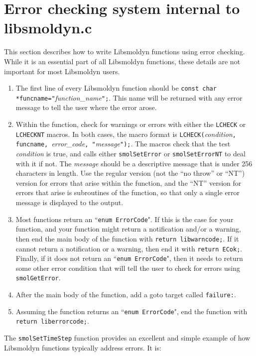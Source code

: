 \documentclass {book}
\newcommand {\ttt} {\texttt}
\begin{document}
\section{Error checking system internal to libsmoldyn.c}

This section describes how to write Libsmoldyn functions using error checking. While it is an essential part of all Libsmoldyn functions, these details are not important for most Libsmoldyn users.

\begin{enumerate}
\item The first line of every Libsmoldyn function should be \ttt{const char *funcname="}\emph{function\_name}\ttt{";}. This name will be returned with any error message to tell the user where the error arose.
\item Within the function, check for warnings or errors with either the \ttt{LCHECK} or \ttt{LCHECKNT} macros. In both cases, the macro format is \ttt{LCHECK(}\emph{condition}\ttt{, funcname, }\emph{error\_code}\ttt{, "}\emph{message}\ttt{");}. The macros check that the test \emph{condition} is true, and calls either \ttt{smolSetError} or \ttt{smolSetErrorNT} to deal with it if not. The \emph{message} should be a descriptive message that is under 256 characters in length. Use the regular version (not the ``no throw'' or ``NT'') version for errors that arise within the function, and the ``NT'' version for errors that arise is subroutines of the function, so that only a single error message is displayed to the output.
\item Most functions return an ``\ttt{enum ErrorCode}". If this is the case for your function, and your function might return a notification and/or a warning, then end the main body of the function with \ttt{return libwarncode;}. If it cannot return a notification or a warning, then end it with \ttt{return ECok;}. Finally, if it does not return an ``\ttt{enum ErrorCode}", then it needs to return some other error condition that will tell the user to check for errors using \ttt{smolGetError}.
\item After the main body of the function, add a goto target called \ttt{failure:}.
\item Assuming the function returns an ``\ttt{enum ErrorCode}", end the function with \ttt{return liberrorcode;}.
\end{enumerate}

The \ttt{smolSetTimeStep} function provides an excellent and simple example of how Libsmoldyn functions typically address errors. It is:
\end{document}
